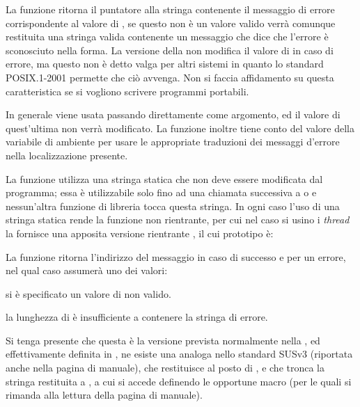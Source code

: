 La funzione ritorna il puntatore alla stringa contenente il messaggio di
errore corrispondente al valore di , se questo non è un valore
valido verrà comunque restituita una stringa valida contenente un messaggio
che dice che l'errore è sconosciuto nella forma. La versione della 
non modifica il valore di  in caso di errore, ma questo non è detto
valga per altri sistemi in quanto lo standard POSIX.1-2001 permette che ciò
avvenga. Non si faccia affidamento su questa caratteristica se si vogliono
scrivere programmi portabili.

In generale  viene usata passando direttamente  come
argomento, ed il valore di quest'ultima non verrà modificato. La funzione
inoltre tiene conto del valore della variabile di ambiente
 per usare le appropriate traduzioni dei messaggi
d'errore nella localizzazione presente.

La funzione  utilizza una stringa statica che non deve essere
modificata dal programma; essa è utilizzabile solo fino ad una chiamata
successiva a  o  e nessun'altra funzione di
libreria tocca questa stringa. In ogni caso l'uso di una stringa statica rende
la funzione non rientrante, per cui nel caso si usino i \textit{thread} la
 fornisce una apposita versione rientrante , il
cui prototipo è:

\begin{funcproto}{
}

{La funzione ritorna l'indirizzo del messaggio in caso di successo e
   per un errore, nel qual caso  assumerà uno dei valori:
  \begin{errlist}
  \item[\errcode{EINVAL}] si è specificato un valore di  non
    valido.
  \item[\errcode{ERANGE}] la lunghezza di  è insufficiente a
    contenere la stringa di errore.
  \end{errlist}
}  
\end{funcproto}

Si tenga presente che questa è la versione prevista normalmente nella
, ed effettivamente definita in , ne esiste una
analoga nello standard SUSv3 (riportata anche nella pagina di manuale), che
restituisce  al posto di , e che tronca la stringa
restituita a , a cui si accede definendo le opportune macro (per
le quali si rimanda alla lettura della pagina di manuale). 

